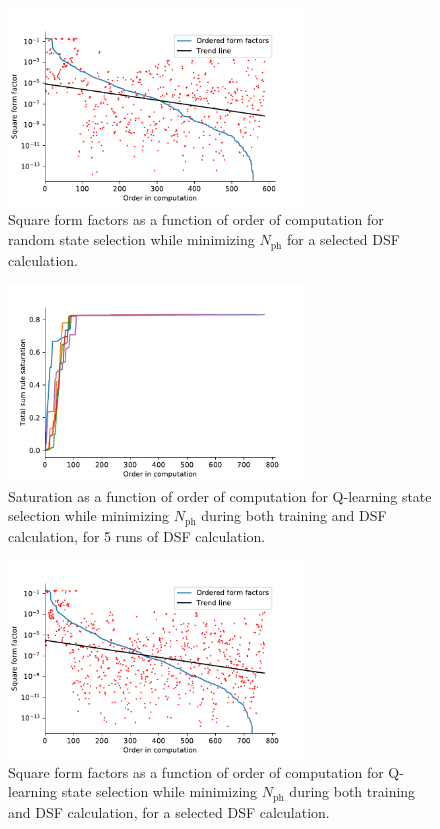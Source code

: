 \documentclass[11pt, a4paper]{report} %
\begin{document}
\begin{figure}[tb!]
  \centering
  \includegraphics[width=0.7\textwidth]{ff_sizes_rand_True_check_train_False_check_eval_True.pdf}
  \caption{Square form factors as a function of order of computation for random state selection while minimizing \(N_{\mathrm{ph}}\) for a selected DSF calculation.}
\end{figure}

\begin{figure}[tb!]
  \centering
  \includegraphics[width=0.7\textwidth]{saturation_histories_rand_False_check_train_True_check_eval_True.pdf}
  \caption{Saturation as a function of order of computation for Q-learning state selection while minimizing \(N_{\mathrm{ph}}\) during both training and DSF calculation, for 5 runs of DSF calculation.}
  \label{fig:saturation_histories_rand_False_check_train_True_check_eval_True}
\end{figure}

\begin{figure}[tb!]
  \centering
  \includegraphics[width=0.7\textwidth]{ff_sizes_rand_False_check_train_True_check_eval_True.pdf}
  \caption{Square form factors as a function of order of computation for Q-learning state selection while minimizing \(N_{\mathrm{ph}}\) during both training and DSF calculation, for a selected DSF calculation.}
  \label{fig:ff_sizes_rand_False_check_train_True_check_eval_True}
\end{figure}
\end{document}
